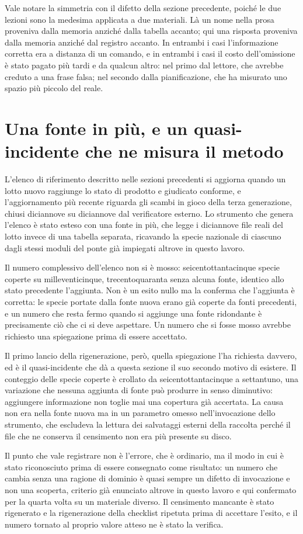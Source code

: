 Vale notare la simmetria con il difetto della sezione precedente, poiché le due lezioni sono la medesima applicata a due materiali. Là un nome nella prosa proveniva dalla memoria anziché dalla tabella accanto; qui una risposta proveniva dalla memoria anziché dal registro accanto. In entrambi i casi l'informazione corretta era a distanza di un comando, e in entrambi i casi il costo dell'omissione è stato pagato più tardi e da qualcun altro: nel primo dal lettore, che avrebbe creduto a una frase falsa; nel secondo dalla pianificazione, che ha misurato uno spazio più piccolo del reale.

\section{Una fonte in più, e un quasi-incidente che ne misura il metodo}

L'elenco di riferimento descritto nelle sezioni precedenti si aggiorna quando un lotto nuovo raggiunge lo stato di prodotto e giudicato conforme, e l'aggiornamento più recente riguarda gli scambi in gioco della terza generazione, chiusi diciannove su diciannove dal verificatore esterno. Lo strumento che genera l'elenco è stato esteso con una fonte in più, che legge i diciannove file reali del lotto invece di una tabella separata, ricavando la specie nazionale di ciascuno dagli stessi moduli del ponte già impiegati altrove in questo lavoro.

Il numero complessivo dell'elenco non si è mosso: seicentottantacinque specie coperte su milleventicinque, trecentoquaranta senza alcuna fonte, identico allo stato precedente l'aggiunta. Non è un esito nullo ma la conferma che l'aggiunta è corretta: le specie portate dalla fonte nuova erano già coperte da fonti precedenti, e un numero che resta fermo quando si aggiunge una fonte ridondante è precisamente ciò che ci si deve aspettare. Un numero che si fosse mosso avrebbe richiesto una spiegazione prima di essere accettato.

Il primo lancio della rigenerazione, però, quella spiegazione l'ha richiesta davvero, ed è il quasi-incidente che dà a questa sezione il suo secondo motivo di esistere. Il conteggio delle specie coperte è crollato da seicentottantacinque a settantuno, una variazione che nessuna aggiunta di fonte può produrre in senso diminutivo: aggiungere informazione non toglie mai una copertura già accertata. La causa non era nella fonte nuova ma in un parametro omesso nell'invocazione dello strumento, che escludeva la lettura dei salvataggi esterni della raccolta perché il file che ne conserva il censimento non era più presente su disco.

Il punto che vale registrare non è l'errore, che è ordinario, ma il modo in cui è stato riconosciuto prima di essere consegnato come risultato: un numero che cambia senza una ragione di dominio è quasi sempre un difetto di invocazione e non una scoperta, criterio già enunciato altrove in questo lavoro e qui confermato per la quarta volta su un materiale diverso. Il censimento mancante è stato rigenerato e la rigenerazione della checklist ripetuta prima di accettare l'esito, e il numero tornato al proprio valore atteso ne è stato la verifica.
